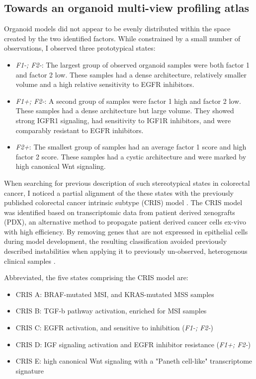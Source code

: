 \begin{flushleft}
\subsection{Towards an organoid multi-view profiling atlas}
Organoid models did not appear to be evenly distributed within the space created by the two identified factors. While constrained by a small number of observations, I observed three prototypical states:
\begin{itemize} 
    \item \textit{F1-; F2-}: The largest group of observed organoid samples were both factor 1 and factor 2 low. These samples had a dense architecture, relatively smaller volume and a high relative sensitivity to EGFR inhibitors. 
    \item \textit{F1+; F2-}: A second group of samples were factor 1 high and factor 2 low. These samples had a dense architecture but large volume. They showed strong IGFR1 signaling, had sensitivity to IGF1R inhibitors, and were comparably resistant to EGFR inhibitors. 
    \item \textit{F2+}: The smallest group of samples had an average factor 1 score and high factor 2 score. These samples had a cystic architecture and were marked by high canonical Wnt signaling. 
\end{itemize}

When searching for previous description of such stereotypical states in colorectal cancer, I noticed a partial alignment of the these states with the previously published colorectal cancer intrinsic subtype (CRIS) model \citep{isellaSelectiveAnalysisCancercell2017a}. The CRIS model was identified based on transcriptomic data from patient derived xenografts (PDX), an alternative method to propagate patient derived cancer cells ex-vivo with high efficiency. By removing genes that are not expressed in epithelial cells during model development, the resulting classification avoided previously described instabilities when applying it to previously un-observed, heterogenous clinical samples \citep{dunneCancercellIntrinsicGene2017}.

Abbreviated, the five states comprising the CRIS model are: 
\begin{itemize} 
    \item CRIS A: BRAF-mutated MSI, and KRAS-mutated MSS samples
    \item CRIS B: TGF-b pathway activation, enriched for MSI samples 
    \item CRIS C: EGFR activation, and sensitive to inhibition (\textit{F1-; F2-})
    \item CRIS D: IGF signaling activation and EGFR inhibitor resistance (\textit{F1+; F2-}) 
    \item CRIS E: high canonical Wnt signaling with a "Paneth cell-like" transcriptome signature
\end{itemize}


\end{flushleft}
